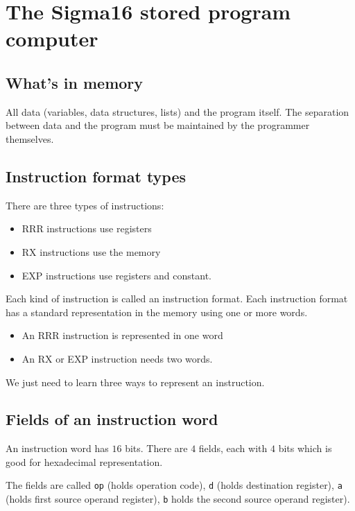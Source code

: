 \section{The Sigma16 stored program computer}\label{sec:the_sigma16_stored_program_computer}

\subsection{What's in memory}\label{sub:what_s_in_memory}

All data (variables, data structures, lists) and the program itself.
The separation between data and the program must be maintained by the programmer themselves.

\subsection{Instruction format types}\label{sub:instruction_format_types}

There are three types of instructions:
\begin{itemize}
    \item RRR instructions use registers
    \item RX instructions use the memory
    \item EXP instructions use registers and constant.
\end{itemize}
%
Each kind of instruction is called an instruction format.
Each instruction format has a standard representation in the memory using one or more words.
\begin{itemize}
    \item An RRR instruction is represented in one word
    \item An RX or EXP instruction needs two words.
\end{itemize}
%
We just need to learn three ways to represent an instruction.

\subsection{Fields of an instruction word}\label{sub:fields_of_an_instruction_word}

An instruction word has \(16\) bits.
There are \(4\) fields, each with \(4\) bits which is good for hexadecimal representation.

The fields are called \texttt{op} (holds operation code), \texttt{d} (holds destination register), \texttt{a} (holds first source operand register), \texttt{b} holds the second source operand register).

